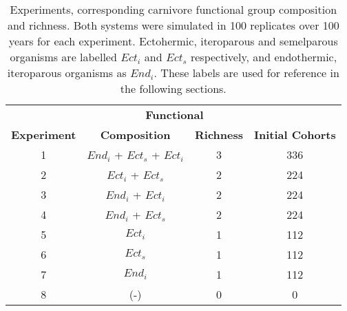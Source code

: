 \begin{table}[htb!]
\centering
\caption[Experimental design and details]{Experiments, corresponding carnivore functional group composition and richness. Both systems were simulated in 100 replicates over 100 years for each experiment. Ectohermic, iteroparous and semelparous organisms are labelled $Ect_i$ and $Ect_s$ respectively, and endothermic, iteroparous organisms as $End_i$. These labels are used for reference in the following sections.} 
\label{tab:mat:exp}
\begin{tabular*}{\textwidth}{@{\extracolsep{\fill} } cccc}
  \toprule
  & \multicolumn{2}{c}{\textbf{~~~Functional}} & \\ \cmidrule(lr){2-3}
\textbf{Experiment} & \textbf{Composition} & \textbf{Richness} & \textbf{Initial Cohorts} \\ 
  \midrule
  1 & $End_i$ + $Ect_s$ + $Ect_i$ & 3 & 336 \\ 
   [1ex]  2 & $Ect_i$ + $Ect_s$ & 2 & 224 \\ 
    3 & $End_i$ + $Ect_i$ & 2 & 224 \\ 
    4 & $End_i$ + $Ect_s$ & 2 & 224 \\ 
   [1ex]  5 & $Ect_i$ & 1 & 112 \\ 
    6 & $Ect_s$ & 1 & 112 \\ 
    7 & $End_i$ & 1 & 112 \\ 
   [1ex]  8 & (-) & 0 & 0 \\ 
   \bottomrule
\end{tabular*}
\end{table}
